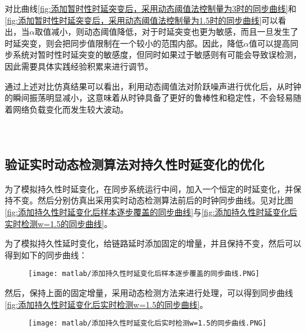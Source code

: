 对比曲线\ref{fig:添加暂时性时延突变后，采用动态阈值法控制量为3时的同步曲线}和\ref{fig:添加暂时性时延突变后，采用动态阈值法控制量为1.5时的同步曲线}可以看出，当$\alpha$取值减小，则动态阈值降低，对于时延突变也更为敏感，而且一旦发生了时延突变，则会把同步值限制在一个较小的范围内部。因此，降低$\alpha$值可以提高同步系统对暂时性时延突变的敏感度，但同时如果过于敏感则有可能会导致误检测，因此需要具体实践经验积累来进行调节。

通过上述对比仿真结果可以看出，利用动态阈值法对阶跃噪声进行优化后，从时钟的瞬间振荡明显减小，这意味着从时钟具备了更好的鲁棒性和稳定性，不会轻易随着网络负载变化而发生较大波动。
\\
\\
\\
\subsection{验证实时动态检测算法对持久性时延变化的优化}
为了模拟持久性时延变化，在同步系统运行中间，加入一个恒定的时延变化，并保持不变。然后分别仿真出采用实时动态检测算法前后的时钟同步曲线。见对比图\ref{fig:添加持久性时延变化后样本逐步覆盖的同步曲线}与\ref{fig:添加持久性时延变化后实时检测w=1.5的同步曲线}。

为了模拟持久性延时变化，给链路延时添加固定的增量，并且保持不变，然后可以得到如下的同步曲线：

\begin{figure}[!hbp]
  \centering
  \begin{minipage}[b]{1\textwidth}
    \captionstyle{\centering}
    \centering
    \texttt{[image: matlab/添加持久性时延变化后样本逐步覆盖的同步曲线.PNG]}
  \end{minipage}     
\end{figure}

然后，保持上面的固定增量，采用动态检测方法来进行处理，可以得到同步曲线\ref{fig:添加持久性时延变化后实时检测w=1.5的同步曲线}。

\begin{figure}[htbp]
  \centering
  \begin{minipage}[b]{1\textwidth}
    \captionstyle{\centering}
    \centering
    \texttt{[image: matlab/添加持久性时延变化后实时检测w=1.5的同步曲线.PNG]}
  \end{minipage}     
\end{figure}

